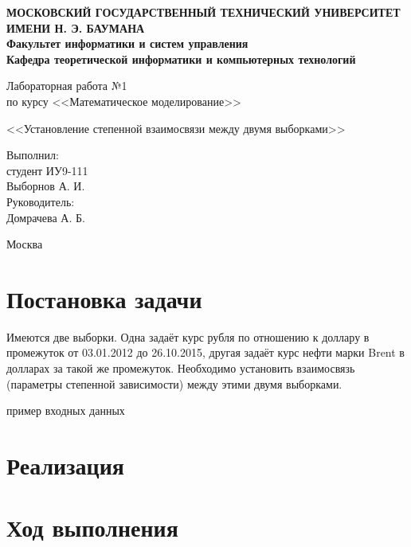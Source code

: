 \documentclass[12pt,a4paper,oneside]{extarticle}
\begin{document}
\pgfplotsset{compat=1.8}

\thispagestyle{empty}
\newpage
{
\centering


\textbf{
МОСКОВСКИЙ ГОСУДАРСТВЕННЫЙ ТЕХНИЧЕСКИЙ УНИВЕРСИТЕТ ИМЕНИ Н. Э. БАУМАНА \\
Факультет информатики и систем управления \\
Кафедра теоретической информатики и компьютерных технологий}
\bigskip
\bigskip
\bigskip
\bigskip
\bigskip
\bigskip
\bigskip

\vfill


Лабораторная работа №1 \\
по курсу <<Математическое моделирование>>

\bigskip

{\large <<Установление степенной взаимосвязи между двумя выборками>>}
\bigskip

\vfill



\hfill\parbox{4cm} {
Выполнил:\\
студент ИУ9-111 \hfill \\
Выборнов А. И.\hfill \medskip\\
Руководитель:\\
Домрачева А. Б.\hfill
}


\vspace{\fill}

Москва \number\year
\clearpage
}



\clearpage


\section{Постановка задачи}
    Имеются две выборки. Одна задаёт курс рубля по отношению к доллару в промежуток от 03.01.2012 до 26.10.2015, другая задаёт курс нефти марки Brent в долларах за такой же промежуток. Необходимо установить взаимосвязь (параметры степенной зависимости) между этими двумя выборками.
    
пример входных данных


\section{Реализация}

\section{Ход выполнения}
\end{document}

